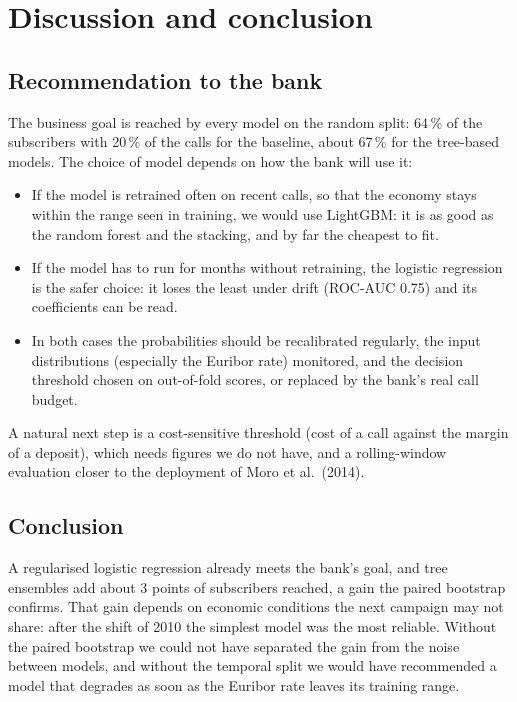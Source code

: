 \documentclass[11pt,a4paper]{article}
\begin{document}
\section{Discussion and conclusion}

\subsection{Recommendation to the bank}
The business goal is reached by every model on the random split: 64\,\% of the subscribers with 20\,\% of the calls for
the baseline, about 67\,\% for the tree-based models. The choice of model depends on how the bank will use it:
\begin{itemize}
\item If the model is retrained often on recent calls, so that the economy stays within the range seen in training,
we would use LightGBM: it is as good as the random forest and the stacking, and by far the cheapest to fit.
\item If the model has to run for months without retraining, the logistic regression is the safer choice: it loses
the least under drift (ROC-AUC 0.75) and its coefficients can be read.
\item In both cases the probabilities should be recalibrated regularly, the input distributions (especially the
Euribor rate) monitored, and the decision threshold chosen on out-of-fold scores, or replaced by the bank's real
call budget.
\end{itemize}
A natural next step is a cost-sensitive threshold (cost of a call against the margin of a deposit), which needs
figures we do not have, and a rolling-window evaluation closer to the deployment of Moro et al.\ (2014).

\subsection{Conclusion}
A regularised logistic regression already meets the bank's goal, and tree ensembles add about 3 points of
subscribers reached, a gain the paired bootstrap confirms. That gain depends on economic conditions the next campaign
may not share: after the shift of 2010 the simplest model was the most reliable. Without the paired bootstrap we could
not have separated the gain from the noise between models, and without the temporal split we would have recommended
a model that degrades as soon as the Euribor rate leaves its training range.
\end{document}
